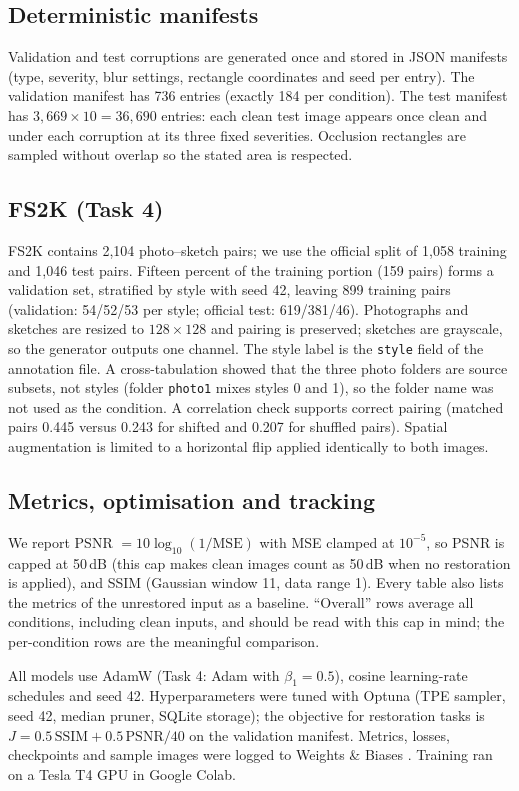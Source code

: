 \documentclass[conference]{IEEEtran}
\newcommand{\ssim}{\mathrm{SSIM}}
\begin{document}
\subsection{Deterministic manifests}
Validation and test corruptions are generated once and stored in JSON manifests (type, severity, blur settings, rectangle coordinates and seed per entry). The validation manifest has 736 entries (exactly 184 per condition). The test manifest has $3{,}669\times10=36{,}690$ entries: each clean test image appears once clean and under each corruption at its three fixed severities. Occlusion rectangles are sampled without overlap so the stated area is respected.

\subsection{FS2K (Task 4)}
FS2K \cite{fan2022fs2k} contains 2{,}104 photo--sketch pairs; we use the official split of 1{,}058 training and 1{,}046 test pairs. Fifteen percent of the training portion (159 pairs) forms a validation set, stratified by style with seed 42, leaving 899 training pairs (validation: 54/52/53 per style; official test: 619/381/46). Photographs and sketches are resized to $128\times128$ and pairing is preserved; sketches are grayscale, so the generator outputs one channel. The style label is the \texttt{style} field of the annotation file. A cross-tabulation showed that the three photo folders are source subsets, not styles (folder \texttt{photo1} mixes styles 0 and 1), so the folder name was not used as the condition. A correlation check supports correct pairing (matched pairs 0.445 versus 0.243 for shifted and 0.207 for shuffled pairs). Spatial augmentation is limited to a horizontal flip applied identically to both images.

\subsection{Metrics, optimisation and tracking}
We report PSNR $=10\log_{10}(1/\mathrm{MSE})$ with MSE clamped at $10^{-5}$, so PSNR is capped at 50\,dB (this cap makes clean images count as 50\,dB when no restoration is applied), and SSIM (Gaussian window 11, data range 1). Every table also lists the metrics of the unrestored input as a baseline. ``Overall'' rows average all conditions, including clean inputs, and should be read with this cap in mind; the per-condition rows are the meaningful comparison.

All models use AdamW (Task 4: Adam with $\beta_1=0.5$), cosine learning-rate schedules and seed 42. Hyperparameters were tuned with Optuna \cite{akiba2019} (TPE sampler, seed 42, median pruner, SQLite storage); the objective for restoration tasks is $J=0.5\,\ssim+0.5\,\mathrm{PSNR}/40$ on the validation manifest. Metrics, losses, checkpoints and sample images were logged to Weights \& Biases \cite{biewald2020}. Training ran on a Tesla T4 GPU in Google Colab.
\end{document}
